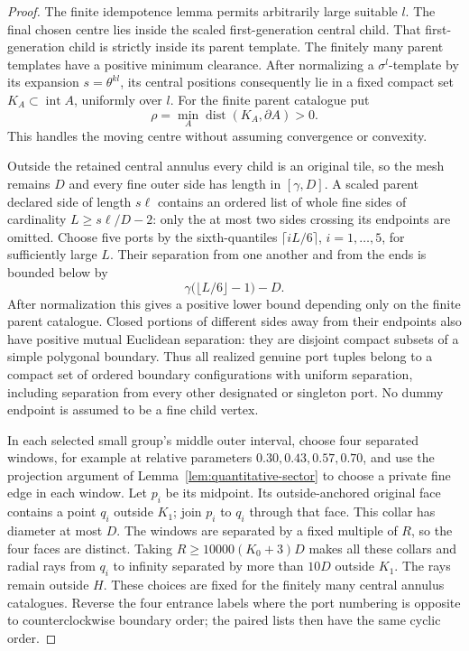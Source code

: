 \begin{proof}
The finite idempotence lemma permits arbitrarily large suitable $l$.
The final chosen centre lies inside the scaled first-generation central
child.  That first-generation child is strictly inside its parent
template.  The finitely many parent templates have a positive minimum
clearance.  After normalizing a $\sigma^l$-template by its expansion
$s=\theta^{kl}$, its central positions consequently lie in a fixed compact
set $K_A\subset\operatorname{int}A$, uniformly over $l$.
For the finite parent catalogue put
\[
 \rho=\min_A\operatorname{dist}(K_A,\partial A)>0.
\]
This handles the moving centre without assuming convergence or convexity.

Outside the retained central annulus every child is an original tile,
so the mesh remains $D$ and every fine outer side has length in
$[\gamma,D]$.  A scaled parent declared side of length $s\ell$ contains
an ordered list of whole fine sides of cardinality
$L\ge s\ell/D-2$: only the at most two sides crossing its endpoints
are omitted.  Choose five ports by the sixth-quantiles
$\lceil iL/6\rceil$, $i=1,\ldots,5$, for sufficiently large $L$.
Their separation from one another and from the ends is bounded below by
\[
 \gamma\bigl(\lfloor L/6\rfloor-1\bigr)-D.
\]
After normalization this gives a positive lower bound depending only on
the finite parent catalogue.  Closed portions of different sides away
from their endpoints also have positive mutual Euclidean separation:
they are disjoint compact subsets of a simple polygonal boundary.
Thus all realized genuine port tuples belong to a compact set of ordered
boundary configurations with uniform separation, including separation
from every other designated or singleton port.  No dummy endpoint is
assumed to be a fine child vertex.

In each selected small group's middle outer interval, choose four
separated windows, for example at relative parameters
$0.30,0.43,0.57,0.70$, and use the projection argument of
Lemma~\ref{lem:quantitative-sector} to choose a private fine edge in
each window.  Let $p_i$ be its midpoint.  Its outside-anchored original
face contains a point $q_i$ outside $K_1$; join $p_i$ to $q_i$ through
that face.  This collar has diameter at most $D$.  The windows are
separated by a fixed multiple of $R$, so the four faces are distinct.
Taking $R\ge10000(K_0+3)D$ makes all these collars and radial rays from
$q_i$ to infinity separated by more than $10D$ outside $K_1$.
The rays remain outside $H$.  These choices are fixed for the finitely
many central annulus catalogues.  Reverse the four entrance labels
where the port numbering is opposite to counterclockwise boundary order;
the paired lists then have the same cyclic order.


\end{proof}
